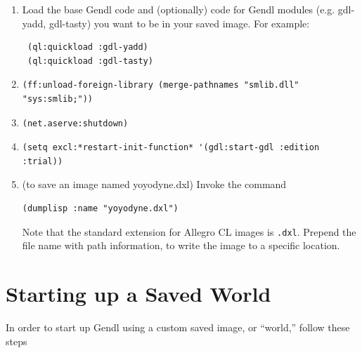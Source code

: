 \documentclass [11pt]{book}
\begin{document}
\begin{enumerate}

\item Load the base Gendl code and (optionally) code for Gendl
modules (e.g. gdl-yadd, gdl-tasty) you want to be in your saved image. For example:

\begin{verbatim}
 (ql:quickload :gdl-yadd) 
 (ql:quickload :gdl-tasty)
\end{verbatim}


\item



\begin{verbatim}(ff:unload-foreign-library (merge-pathnames "smlib.dll" "sys:smlib;"))
\end{verbatim}

\item



\begin{verbatim}(net.aserve:shutdown)
\end{verbatim}

\item



\begin{verbatim}(setq excl:*restart-init-function* '(gdl:start-gdl :edition :trial))
\end{verbatim}
\item  (to save an image named yoyodyne.dxl) Invoke the command 

\begin{verbatim}(dumplisp :name "yoyodyne.dxl")
\end{verbatim}Note that the standard extension for Allegro CL images is \texttt{.dxl}. Prepend the file name with path information, to write the image to a specific location.

\end{enumerate}



\section{Starting up a Saved World}

\label{sec:startingupasavedworld}

In order to start up Gendl using a custom saved image, or ``world,'' follow these steps
\end{document}
